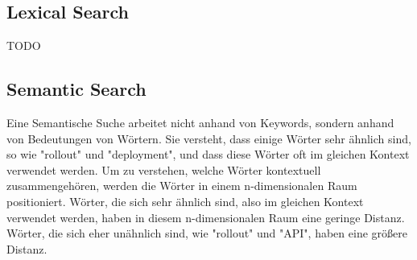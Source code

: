 \subsection{Lexical Search}
TODO

\subsection{Semantic Search}
Eine Semantische Suche arbeitet nicht anhand von Keywords, sondern anhand von Bedeutungen von Wörtern.
Sie versteht, dass einige Wörter sehr ähnlich sind, so wie "rollout" und "deployment", und dass diese Wörter oft im gleichen Kontext verwendet werden.
Um zu verstehen, welche Wörter kontextuell zusammengehören, werden die Wörter in einem n-dimensionalen Raum positioniert.
Wörter, die sich sehr ähnlich sind, also im gleichen Kontext verwendet werden, haben in diesem n-dimensionalen Raum eine geringe Distanz.
Wörter, die sich eher unähnlich sind, wie "rollout" und "API", haben eine größere Distanz.\\

